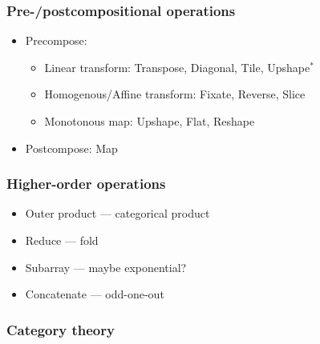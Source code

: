 \documentclass[xetex,mathserif,serif]{beamer}
\newcommand\Zheil{\mathbb{Z}}
\begin{document}
\begin{frame}
  \frametitle{Pre-/postcompositional operations}
  
  \begin{itemize}
    \item Precompose:
    \begin{itemize}
      \item Linear transform: Transpose, Diagonal, Tile, Upshape$^*$
      \item Homogenous/Affine transform: Fixate, Reverse, Slice
      \item Monotonous map: Upshape, Flat, Reshape
    \end{itemize}
    \item Postcompose: Map
  \end{itemize}
\end{frame}

\begin{frame}
  \frametitle{Higher-order operations}
  
  \begin{itemize}
    \item Outer product --- categorical product
    \item Reduce --- fold
    \item Subarray --- maybe exponential?
    \item Concatenate --- odd-one-out
  \end{itemize}
\end{frame}


\begin{frame}
  \frametitle{Category theory}
  
  \begin{center}
    \\[2em]
    

  \end{center}
\end{frame}
\end{document}
